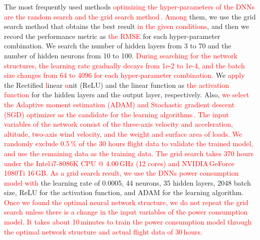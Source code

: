 \documentclass[journal]{./template/IEEEtran}
\begin{document}
The most frequently used methods \textcolor{red}{optimizing the hyper-parameters of the DNNs are the random search and the grid search method\,\cite{ref_16}.} 
\textcolor{red}{Among} them, we use the grid search method that obtains the best result \textcolor{red}{in the given conditions}, and then we record the performance metric as \textcolor{red}{the RMSE} for each hyper-parameter combination.
We search the number of hidden layers from 3 to 70 and the number of hidden neurons from 10 to 100. 
\textcolor{red}{During searching for the network structures, the learning rate gradually decays from 1e-2 to 1e-4, and the batch size changes from 64 to 4096 for each hyper-parameter combination.}
We \textcolor{red}{apply} the Rectified \textcolor{red}linear \textcolor{red}{u}nit (ReLU) and the linear function as \textcolor{red}{the activation function} for the hidden layers and the output layer, respectively.
Also, \textcolor{red}{we select the Adaptive moment estimation (ADAM) and Stochastic gradient descent (SGD) optimizer as the candidate for the learning algorithms\,\cite{ref_17}. 
The input variables of the network consist of the three-axis velocity and acceleration, altitude, two-axis wind velocity, and the weight and surface area of loads.} 
\textcolor{red}{We randomly exclude 0.5\,\% of the 30 hours flight data to validate the trained model, and use the remaining data as the training data.
The grid search takes 370 hours under the Intel\textregistered \,i7-8086K CPU @ 4.00\,GHz (12 cores) and NVIDIA\textregistered \,GeForce 1080Ti 16\,GB. 
As a grid search result, we use the DNNs power consumption model with} the learning rate of 0.0005, 44 neurons, 35 hidden layers, 2048 batch size, ReLU for the activation function, and ADAM for the learning algorithm.
\textcolor{red}{Once we found the optimal neural network structure, we do not repeat the grid search unless there is a change in the input variables of the power consumption model.
It takes about 10\,minutes to train the power consumption model through the optimal network structure and actual flight data of 30\,hours.}
\end{document}
